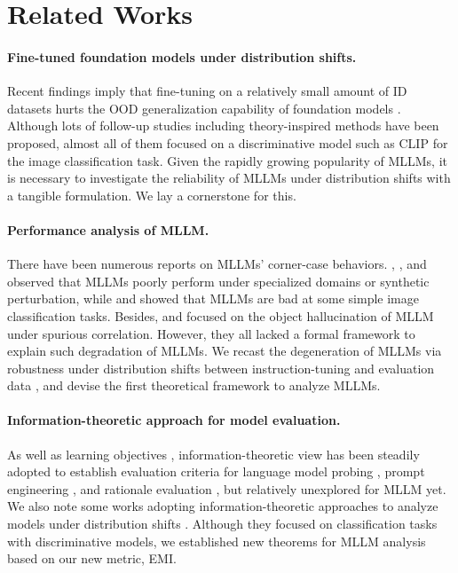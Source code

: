 \vspace{-1em}
\section{Related Works} \label{sec:related_works}

\paragraph{Fine-tuned foundation models under distribution shifts.} 
Recent findings imply that fine-tuning on a relatively small amount of ID datasets hurts the OOD generalization capability of foundation models \cite{kumar2022fine, wortsman2022robust}. Although lots of follow-up studies \cite{goyal2023finetune, tian2023trainable, oh2025dawin} including theory-inspired methods \cite{kumar2022fine, pmlr-v162-ju22a, oh2024towards} have been proposed, almost all of them focused on a discriminative model such as CLIP \cite{radford2021learning} for the image classification task. Given the rapidly growing popularity of MLLMs, it is necessary to investigate the reliability of MLLMs under distribution shifts with a tangible formulation. We lay a cornerstone for this.
\vspace{-0.25em}
\paragraph{Performance analysis of MLLM.} There have been numerous reports on MLLMs' corner-case behaviors. \citet{zhang2024out}, \citet{zhou2024adapting}, and \citet{verma2024evaluating} observed that MLLMs poorly perform under specialized domains or synthetic perturbation, while  \citet{zhai2024investigating} and \citet{zhang2024vlmclf} showed that MLLMs are bad at some simple image classification tasks. Besides, \citet{li2023evaluating} and \citet{ye2025beaf} focused on the object hallucination of MLLM under spurious correlation. However, they all lacked a formal framework to explain such degradation of MLLMs. We recast the degeneration of MLLMs via robustness under distribution shifts between instruction-tuning and evaluation data \cite{liang2025aligning}, and devise the first theoretical framework to analyze MLLMs.

\paragraph{Information-theoretic approach for model evaluation.} As well as learning objectives \cite{alemi2016deep, chen2016infogan, Tschannen2020On, Kong2020A, wang2021infobert}, information-theoretic view has been steadily adopted to establish evaluation criteria for language model probing \cite{hewitt2021conditional}, prompt engineering \cite{sorensen2022information}, and rationale evaluation \cite{chen2023rev}, but relatively unexplored for MLLM yet. We also note some works adopting information-theoretic approaches to analyze models under distribution shifts \cite{federici2021information, shui2022novel}. Although they focused on classification tasks with discriminative models, we established new theorems for MLLM analysis based on our new metric, EMI.
